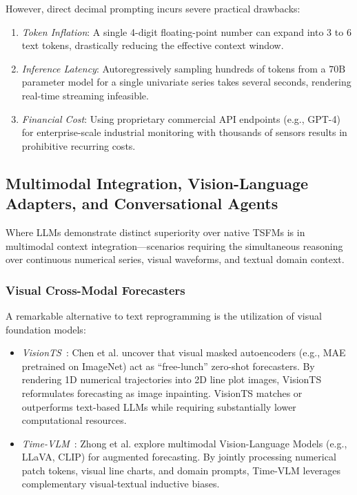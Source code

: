However, direct decimal prompting incurs severe practical drawbacks:
\begin{enumerate}[leftmargin=*]
    \item \emph{Token Inflation}: A single 4-digit floating-point number can expand into 3 to 6 text tokens, drastically reducing the effective context window.
    \item \emph{Inference Latency}: Autoregressively sampling hundreds of tokens from a $70\text{B}$ parameter model for a single univariate series takes several seconds, rendering real-time streaming infeasible.
    \item \emph{Financial Cost}: Using proprietary commercial API endpoints (e.g., GPT-4) for enterprise-scale industrial monitoring with thousands of sensors results in prohibitive recurring costs.
\end{enumerate}

\subsection{Multimodal Integration, Vision-Language Adapters, and Conversational Agents}

Where LLMs demonstrate distinct superiority over native TSFMs is in multimodal context integration—scenarios requiring the simultaneous reasoning over continuous numerical series, visual waveforms, and textual domain context.

\subsubsection{Visual Cross-Modal Forecasters}
A remarkable alternative to text reprogramming is the utilization of visual foundation models:
\begin{itemize}[leftmargin=*]
    \item \emph{VisionTS}~\cite{chen2024visionts}: Chen et al. uncover that visual masked autoencoders (e.g., MAE pretrained on ImageNet) act as ``free-lunch'' zero-shot forecasters. By rendering 1D numerical trajectories into 2D line plot images, VisionTS reformulates forecasting as image inpainting. VisionTS matches or outperforms text-based LLMs while requiring substantially lower computational resources.
    \item \emph{Time-VLM}~\cite{zhong2025timevlm}: Zhong et al. explore multimodal Vision-Language Models (e.g., LLaVA, CLIP) for augmented forecasting. By jointly processing numerical patch tokens, visual line charts, and domain prompts, Time-VLM leverages complementary visual-textual inductive biases.
\end{itemize}

